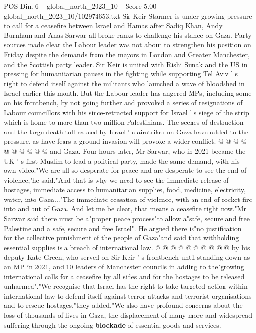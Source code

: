 \begin{textsample}{POS Dim 6 – global\_north\_2023\_10 – Score 5.00 – global\_north\_2023\_10/102974653.txt}  \label{ex:f6_pos_247}
Sir Keir Starmer is under growing pressure to call for a ceasefire between Israel and Hamas after Sadiq Khan, Andy Burnham and Anas Sarwar all broke ranks to challenge his stance on Gaza.
Party sources made clear the Labour leader was not about to strengthen his position on Friday despite the demands from the mayors in London and Greater Manchester, and the Scottish party leader.
Sir Keir is united with Rishi Sunak and the US in pressing for humanitarian pauses in the fighting while supporting Tel Aviv ' s right to defend itself against the militants who launched a wave of bloodshed in Israel earlier this month.
But the Labour leader has angered MPs, including some on his frontbench, by not going further and provoked a series of resignations of Labour councillors with his since-retracted support for Israel ' s siege of the strip which is home to more than two million Palestinians.
The scenes of destruction and the large death toll caused by Israel ' s airstrikes on Gaza have added to the pressure, as have fears a ground invasion will provoke a wider conflict. @ @ @ @ @ @ @ @ @ @ and Gaza.
Four hours later, Mr Sarwar, who in 2021 became the UK ' s first Muslim to lead a political party, made the same demand, with his own video."We are all so desperate for peace and are desperate to see the end of violence,"he said."And that is why we need to see the immediate release of hostages, immediate access to humanitarian supplies, food, medicine, electricity, water, into Gaza..."The immediate cessation of violence, with an end of rocket fire into and out of Gaza.
And let me be clear, that means a ceasefire right now."Mr Sarwar said there must be a"proper peace process"to allow a"safe, secure and free Palestine and a safe, secure and free Israel".
He argued there is"no justification for the collective punishment of the people of Gaza"and said that withholding essential supplies is a breach of international law. @ @ @ @ @ @ @ @ @ @ by his deputy Kate Green, who served on Sir Keir ' s frontbench until standing down as an MP in 2021, and 10 leaders of Manchester councils in adding to the"growing international calls for a ceasefire by all sides and for the hostages to be released unharmed"."We recognise that Israel has the right to take targeted action within international law to defend itself against terror attacks and terrorist organisations and to rescue hostages,"they added."We also have profound concerns about the loss of thousands of lives in Gaza, the displacement of many more and widespread suffering through the ongoing \textbf{blockade} of essential goods and services.

\end{textsample}
